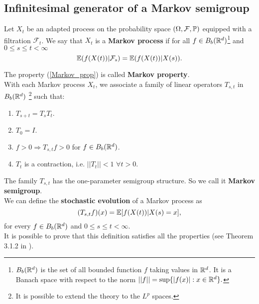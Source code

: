 \subsection{Infinitesimal generator of a Markov semigroup}

\begin{Definition}
 Let $X_t$ be an adapted process on the probability space $(\Omega,\mathcal{F},\mathbb{P})$ equipped with a filtration $\mathcal{F}_t$.
 We say that $X_t$ is a \textbf{Markov process} if for all $f\in B_b(\mathbb{R}^d)$\footnote{$B_b(\mathbb{R}^d)$ 
 is the set of all bounded function $f$ taking values in $\mathbb{R}^d$. It is a Banach space with respect to the norm 
 $ ||f|| = \sup\{ |f(x)| : x\in \mathbb{R}^d \}. $} 
 and $0\leq s \leq t < \infty$
 \begin{equation} \label{Markov_prop}
  \mathbb{E}(f(X(t))|\mathcal{F}_s) = \mathbb{E}(f(X(t))|X(s)).
 \end{equation}
\end{Definition}
The property (\ref{Markov_prop}) is called \textbf{Markov property}.\\

\vspace{1em}
With each Markov process $X_t$, we associate a family of linear operators $T_{s,t}$ in $B_b(\mathbb{R}^d)$ 
\footnote{It is possible to extend the theory to the $L^p$ spaces.}
such that:
\begin{enumerate}
 \item $T_{s+t} = T_sT_t$.
 \item $ T_0 = I $.
 \item $f>0 \Rightarrow T_{s,t}f >0$ for $f\in B_b(\mathbb{R}^d)$.
 \item $T_t$ is a contraction, i.e. $||T_t||<1$ $\forall t>0$.
\end{enumerate}
The family $T_{s,t}$ has the one-parameter semigroup structure. So we call it \textbf{Markov semigroup}.\\  
We can define the \textbf{stochastic evolution} of a Markov process as 
\begin{equation}\label{stoch_evolution}
 (T_{s,t}f)(x) = \mathbb{E}[f(X(t)) |X(s) = x],
\end{equation}
for every $f \in B_b(\mathbb{R}^d)$ and $0\leq s \leq t < \infty$.\\
It is possible to prove that this definition satisfies all the properties (see Theorem 3.1.2 in \cite{Applebaum}). 

